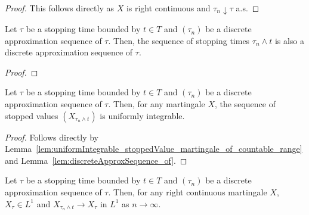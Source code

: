 \begin{proof}
  \leanok
  This follows directly as \(X\) is right continuous and \(\tau_n \downarrow \tau\) a.s.
\end{proof}

\begin{lemma}\label{lem:discreteApproxSequence_of}
  \leanok
  Let \(\tau\) be a stopping time bounded by \(t \in T\) and \((\tau_n)\) be a discrete approximation sequence of \(\tau\).
  Then, the sequence of stopping times \(\tau_n \wedge t\) is also a discrete approximation sequence of \(\tau\).
\end{lemma}

\begin{proof}
  \leanok
\end{proof}

\begin{lemma}\label{lem:uniformIntegrable_stoppedValue_discreteApproxSequence}
  \leanok
  Let \(\tau\) be a stopping time bounded by \(t \in T\) and \((\tau_n)\) be a discrete approximation sequence of \(\tau\).
  Then, for any martingale \(X\), the sequence of stopped values \((X_{\tau_n \wedge t})\) is uniformly integrable.
\end{lemma}

\begin{proof}
  \leanok
  Follows directly by Lemma~\ref{lem:uniformIntegrable_stoppedValue_martingale_of_countable_range} and Lemma~\ref{lem:discreteApproxSequence_of}.
\end{proof}

\begin{lemma}\label{lem:tendsto_eLpNorm_stoppedValue_discreteApproxSequence}
  \leanok
  Let \(\tau\) be a stopping time bounded by \(t \in T\) and \((\tau_n)\) be a discrete approximation sequence of \(\tau\).
  Then, for any right continuous martingale \(X\), \(X_{\tau} \in L^1\) and \(X_{\tau_n \wedge t} \to X_{\tau}\) in \(L^1\) as \(n \to \infty\).
\end{lemma}

